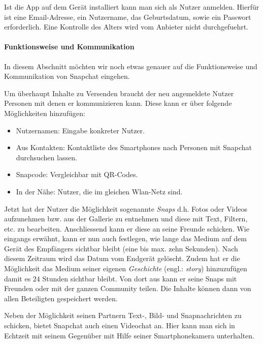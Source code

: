 Ist die App auf dem Ger\"at installiert kann man sich als Nutzer anmelden.
Hierf\"ur ist eine Email-Adresse, ein Nutzername, das Geburtsdatum, sowie ein
Passwort erforderlich. Eine Kontrolle des Alters wird vom Anbieter nicht
durchgefuehrt.

\paragraph{Funktionsweise und Kommunikation}
In diesem Abschnitt m\"ochten wir noch etwas genauer auf die Funktionsweise und
Kommunikation von Snapchat eingehen.

Um \"uberhaupt Inhalte zu Versenden braucht der neu angemeldete Nutzer Personen
mit denen er kommunizieren kann. Diese kann er \"uber folgende M\"oglichkeiten
hinzuf\"ugen:
\begin{itemize}
	\item Nutzernamen: Eingabe konkreter Nutzer.
	\item Aus Kontakten: Kontaktliste des Smartphones nach Personen mit
	Snapchat durchsuchen lassen.
	\item Snapcode: Vergleichbar mit QR-Codes.
	\item In der N\"ahe: Nutzer, die im gleichen Wlan-Netz sind.
\end{itemize}

Jetzt hat der Nutzer die M\"oglichkeit sogenannte \emph{Snaps} d.h. Fotos oder
Videos aufzunehmen bzw. aus der Gallerie zu entnehmen und diese mit Text,
Filtern, etc. zu bearbeiten. Anschliessend kann er diese an seine Freunde
schicken. Wie eingangs erw\"ahnt, kann er nun auch festlegen, wie lange das
Medium auf dem Ger\"at des Empf\"angers sichtbar bleibt (eine bis max. zehn
Sekunden). Nach diesem Zeitraum wird das Datum vom Endger\"at gel\"oscht. Zudem
hat er die M\"oglichkeit das Medium seiner eigenen \emph{Geschichte} (engl.:
\emph{story}) hinzuzuf\"ugen damit es $24$ Stunden sichtbar bleibt. Von dort
aus kann er seine Snaps mit Freunden oder mit der ganzen Community teilen. Die
Inhalte k\"onnen dann von allen Beteiligten gespeichert werden.

Neben der M\"oglichkeit seinen Partnern Text-, Bild- und Snapnachrichten zu
schicken, bietet Snapchat auch einen Videochat an. Hier kann man sich in
Echtzeit mit seinem Gegen\"uber mit Hilfe seiner Smartphonekamera unterhalten.
